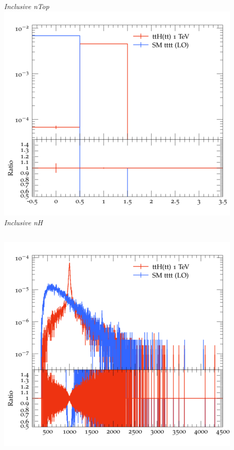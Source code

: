 \documentclass{beamer}
\begin{document}
\begin{frame}
\begin{columns}
\textit{\small Inclusive nTop}
\includegraphics[width=\textwidth]{../plots/ttH_1000/tttt_ttH/Inclusive_nH.png}\\
\textit{\small Inclusive nH}
\end{columns}
\begin{columns}
\includegraphics[width=\textwidth]{../plots/ttH_1000/tttt_ttH/Inclusive_InvM_ttbar12.png}\\

\end{columns}
\end{frame}
\end{document}
